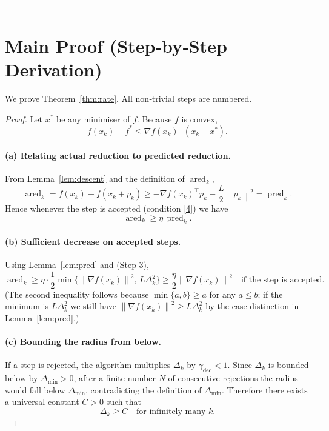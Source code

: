 \documentclass{article}
\newcommand{\norm}[1]{\left\lVert#1\right\rVert}
\begin{document}
---------------------------------------------------------------------

\section*{Main Proof (Step‑by‑Step Derivation)}
We prove Theorem~\ref{thm:rate}. All non‑trivial steps are numbered.

\begin{proof}
Let $x^{*}$ be any minimiser of $f$. Because $f$ is convex,
\[
f(x_{k})-f^{*}\le \nabla f(x_{k})^{\top}(x_{k}-x^{*}). \tag{Step 1}
\]

\paragraph{(a) Relating actual reduction to predicted reduction.}
From Lemma~\ref{lem:descent} and the definition of $\operatorname{ared}_{k}$,
\[
\operatorname{ared}_{k}=f(x_{k})-f(x_{k}+p_{k})
\ge -\nabla f(x_{k})^{\top}p_{k}-\frac{L}{2}\norm{p_{k}}^{2}
= \operatorname{pred}_{k}. \tag{Step 2}
\]
Hence whenever the step is accepted (condition \eqref{4}) we have
\[
\operatorname{ared}_{k}\ge\eta\,\operatorname{pred}_{k}. \tag{Step 3}
\]

\paragraph{(b) Sufficient decrease on accepted steps.}
Using Lemma~\ref{lem:pred} and (Step 3),
\[
\operatorname{ared}_{k}\ge\eta\cdot\frac12
\min\!\Big\{\norm{\nabla f(x_{k})}^{2},\,L\Delta_{k}^{2}\Big\}
\ge\frac{\eta}{2}\norm{\nabla f(x_{k})}^{2}\quad\text{if the step is accepted}. \tag{Step 4}
\]
(The second inequality follows because $\min\{a,b\}\ge a$ for any $a\le b$; if the minimum is $L\Delta_{k}^{2}$ we still have $\norm{\nabla f(x_{k})}^{2}\ge L\Delta_{k}^{2}$ by the case distinction in Lemma~\ref{lem:pred}.)

\paragraph{(c) Bounding the radius from below.}
If a step is rejected, the algorithm multiplies $\Delta_{k}$ by $\gamma_{\text{dec}}<1$.
Since $\Delta_{k}$ is bounded below by $\Delta_{\min}>0$, after a finite number $N$ of consecutive rejections the radius would fall below $\Delta_{\min}$, contradicting the definition of $\Delta_{\min}$. Therefore there exists a universal constant $C>0$ such that
\[
\Delta_{k}\ge C\quad\text{for infinitely many $k$}. \tag{Step 5}
\]


\end{proof}
\end{document}
